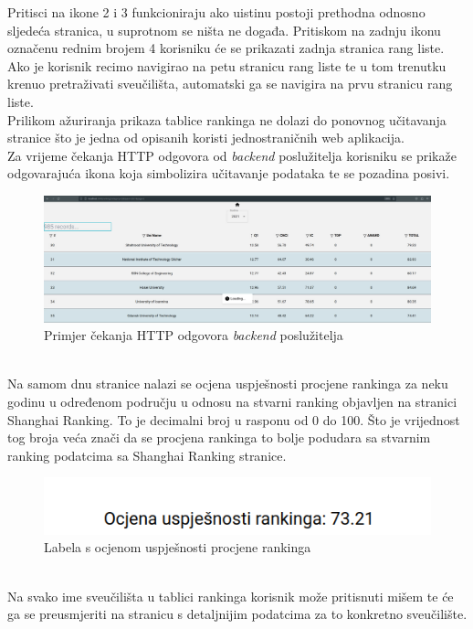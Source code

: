 \documentclass[times, utf8, zavrsni]{fer}
\begin{document}
Pritisci na ikone 2 i 3 funkcioniraju ako uistinu postoji prethodna odnosno sljedeća stranica, u suprotnom se ništa ne događa.
Pritiskom na zadnju ikonu označenu rednim brojem 4 korisniku će se prikazati zadnja stranica rang liste. 
\\Ako je korisnik recimo navigirao na petu stranicu rang liste te u tom trenutku krenuo pretraživati sveučilišta, automatski ga se navigira na prvu stranicu rang liste.
\\Prilikom ažuriranja prikaza tablice rankinga ne dolazi do ponovnog učitavanja stranice što je jedna od opisanih koristi jednostraničnih web aplikacija.
\\Za vrijeme čekanja HTTP odgovora od \emph{backend} poslužitelja korisniku se prikaže odgovarajuća ikona koja simbolizira učitavanje podataka te se pozadina posivi.
\begin{figure}[htb]
    \hspace*{-2cm}  
       \includegraphics[scale=0.21]{loading.png} 
       \caption{Primjer čekanja HTTP odgovora \emph{backend} poslužitelja}
       \label{fig:sort2}
       \end{figure}
\\Na samom dnu stranice nalazi se ocjena uspješnosti procjene rankinga za neku godinu u određenom području u odnosu na stvarni 
ranking objavljen na stranici Shanghai Ranking. To je decimalni broj u rasponu od 0 do 100. Što je vrijednost tog broja veća znači da se procjena 
rankinga to bolje podudara sa stvarnim ranking podatcima sa Shanghai Ranking stranice. 
\begin{figure}[htb]
    \centering
       \includegraphics[scale=0.4]{uspjeh.png} 
       \caption{Labela s ocjenom uspješnosti procjene rankinga}
       \label{fig:uspjeh}
       \end{figure}
\\Na svako ime sveučilišta u tablici rankinga korisnik može pritisnuti mišem te će ga se preusmjeriti na stranicu s detaljnijim podatcima za to konkretno sveučilište.
\end{document}
